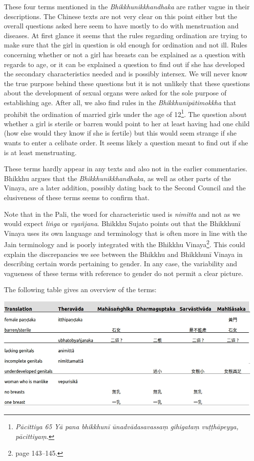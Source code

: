 These four terms mentioned in the {\em Bhikkhunikkhandhaka} are rather vague in their descriptions. The Chinese texts are not very clear on this point either but the overall questions asked here seem to have mostly to do with menstruation and diseases. At first glance it seems that the rules regarding ordination are trying to make sure that the girl in question is old enough for ordination and not ill. Rules concerning whether or not a girl has breasts can be explained as a question with regards to age, or it can be explained a question to find out if she has developed the secondary characteristics needed and is possibly intersex. We will never know the true purpose behind these questions but it is not unlikely that these questions about the development of sexual organs were asked for the sole purpose of establishing age. After all, we also find rules in the {\em Bhikkhunīpātimokkha} that prohibit the ordination of married girls under the age of 12\footnote{{\em Pācittiya 65 Yā pana bhikkhunī ūnad­vāda­sa­vassaṃ gihigataṃ vuṭṭhāpeyya, pācittiyaṃ.}}. The question about whether a girl is sterile or barren would point to her at least having had one child (how else would they know if she is fertile) but this would seem strange if she wants to enter a celibate order. It seems likely a question meant to find out if she is at least menstruating. 

These terms hardly appear in any texts and also not in the earlier commentaries. Bhikkhu \cite{sujato2009} argues that the {\em Bhikkhunikkhandhaka}, as well as other parts of the Vinaya, are a later addition, possibly dating back to the Second Council and the elusiveness of these terms seems to confirm that.

Note that in the Pali, the word for characteristic used is {\em nimitta} and not as we would expect {\em liṅga} or {\em vyañ­jana}. Bhikkhu Sujato points out that the Bhikkhunī Vinaya uses its own language and terminology that is often more in line with the Jain terminology and is poorly integrated with the Bhikkhu Vinaya\footnote{\cite{sujato2009} page 143–145.}. This could explain the discrepancies we see between the Bhikkhu and Bhikkhunī Vinaya in describing certain words pertaining to gender. In any case, the variability and vagueness of these terms with reference to gender do not permit a clear picture. 

The following table gives an overview of the terms:

\bigskip
\includegraphics[width=\linewidth]{female.jpg}
\label{female}

